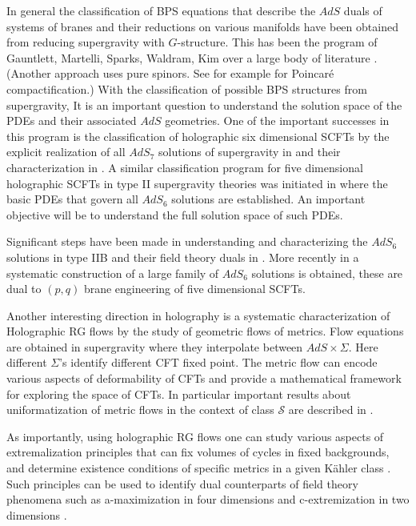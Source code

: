 \documentclass[12pt]{article}
\begin{document}
In general the classification of BPS equations that describe the $AdS$ duals of systems of branes and their reductions on various manifolds have been obtained from reducing supergravity with $G$-structure.  This has been the program of Gauntlett, Martelli, Sparks, Waldram, Kim over a large body of literature \cite{Gauntlett:2003di,Gauntlett:2002sc,Gauntlett:2004hs,Gauntlett:2005ww,Gauntlett:2006ux,Gauntlett:2006af,Gauntlett:2006qw,Gauntlett:2006ns,Gabella:2010laf}. (Another approach uses pure spinors. See for example \cite{Grana:2004bg} for Poincar\'e compactification.)   With the classification of possible BPS structures from supergravity,  It is an important question to understand the solution space of the PDEs and their associated $AdS$ geometries.  One of the important successes in this program is the classification of holographic six dimensional SCFTs by the explicit realization of all $AdS_7$ solutions of supergravity in \cite{Apruzzi:2013yva} and their characterization in \cite{Gaiotto:2014lca}.  A similar classification program for five dimensional holographic SCFTs in type II supergravity theories was initiated in \cite{Apruzzi:2014qva} where the basic PDEs that govern all $AdS_6$ solutions are established.  An important objective will be to understand the full solution space of such PDEs.  

Significant steps have been made in understanding and characterizing the $AdS_6$ solutions in type IIB and their field theory duals in \cite{Bergman:2012kr,Bergman:2013aca}. More recently in \cite{ DHoker:2016ysh,DHoker:2016ujz,DHoker:2017mds,DHoker:2017zwj} a systematic construction of a large family of $AdS_6$ solutions is obtained, these are dual to $(p,q)$ brane engineering of five dimensional SCFTs.  
 
Another interesting direction in holography is a systematic characterization of Holographic RG flows \cite{Freedman:1999gp} by the study of geometric flows of metrics.  Flow equations are obtained in supergravity where they interpolate between $AdS\times \Sigma$.  Here different $\Sigma$'s identify different CFT fixed point.  The metric flow can encode various aspects of deformability of CFTs and provide a mathematical framework for exploring the space of CFTs.  In particular important results about uniformatization of metric flows in the context of class $\mathcal{S}$ are described in \cite{Anderson:2011cz}.  

As importantly, using holographic RG flows one can study various aspects of extremalization principles that can fix volumes of cycles in fixed backgrounds, and determine existence conditions of specific metrics in a given K\"{a}hler class \cite{Martelli:2006yb,Couzens:2018wnk,Gauntlett:2019roi}.  Such principles can be used to identify dual counterparts of  field theory phenomena such as a-maximization in four dimensions \cite{Intriligator:2003jj} and c-extremization in two dimensions \cite{Benini:2013cda,Benini:2012cz}.  
\end{document}
